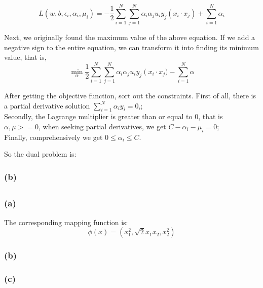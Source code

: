\documentclass[oneside,solution]{seu-ml-assign}
\begin{document}
\begin{equation}L(w,b,\epsilon_i,\alpha_i,\mu_i)=-\frac12\sum_{i=1}^N
  \sum_{j=1}^N\alpha_i\alpha_ju_iy_j\left(x_i\cdot x_j\right)+\sum_{i=1}^N\alpha_i
\end{equation}

Next, we originally found the maximum value of the above equation. 
If we add a negative sign to the entire equation, we can transform it into finding its minimum value, that is,
\begin{equation}\min_\alpha\frac12\sum_{i=1}^N\sum_{j=1}^N\alpha_i\alpha_ju_iy_j\left(x_i\right.\cdot x_j)-\sum_{i=1}^N\alpha \end{equation}

After getting the objective function, sort out the constraints.
First of all, there is a partial derivative solution $\sum_{i=1}^N\alpha_iy_i=0$,;\\
Secondly, the Lagrange multiplier is greater than or equal to 0, that is $\alpha, \mu >=0$, 
when seeking partial derivatives, we get $C-\alpha_i-\mu_i=0$;\\
Finally, comprehensively we get $0\leq\alpha_i\leq C$.

So the dual problem is:



\subsubsection{(b)}


\subsection{}
\subsubsection{(a)}

The corresponding mapping function is:
\begin{equation}\phi(x)=(x_1^2,\sqrt{2}x_1x_2,x_2^2)\end{equation}


\subsubsection{(b)}

\subsubsection{(c)}



\vspace{2mm}
\end{document}
